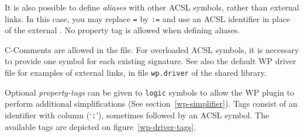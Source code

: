 It is also possible to define \emph{aliases} with other ACSL symbols, rather
than external links. In this case, you may replace \verb+=+ by
\verb+:=+ and use an ACSL identifier in place of the external \user.
No property tag is allowed when defining aliases.

\textsf{C}-Comments are allowed in the file. For overloaded \textsf{ACSL}
symbols, it is necessary to provide one \user symbol for each existing
signature. See also the default \textsf{WP} driver file for examples of external
links, in file \verb+wp.driver+ of the shared library.

Optional \textit{property-tags} can be given to
\texttt{logic} \user symbols to allow the \textsf{WP} plugin to perform
additional simplifications (See section~\ref{wp-simplifier}).  Tags
consist of an identifier with column (`\verb+:+'), sometimes followed
by an ACSL symbol. The available tags are depicted on figure~\ref{wp-driver-tags}.

